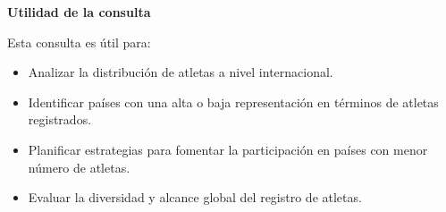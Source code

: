 \textbf{Utilidad de la consulta}

Esta consulta es útil para:
\begin{itemize}
    \item Analizar la distribución de atletas a nivel internacional.
    \item Identificar países con una alta o baja representación en términos de atletas registrados.
    \item Planificar estrategias para fomentar la participación en países con menor número de atletas.
    \item Evaluar la diversidad y alcance global del registro de atletas.
\end{itemize}
